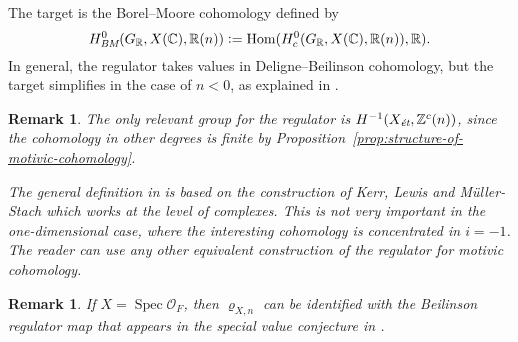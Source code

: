 \documentclass[draft]{article}
\DeclareMathOperator{\Hom}{Hom}
\DeclareMathOperator{\Spec}{Spec}
\newcommand{\CC}{\mathbb{C}}
\newcommand{\RR}{\mathbb{R}}
\newcommand{\ZZ}{\mathbb{Z}}
\newcommand{\BM}{\text{\it BM}}
\newcommand{\et}{\text{\it \'{e}t}}
\newcommand{\dfn}{\mathrel{\mathop:}=}
\theoremstyle{myplain}
\theoremstyle{mydefinition}
\newtheorem{remark}[theorem]{Remark}
\begin{document}
The target is the Borel--Moore cohomology defined by
\[ H^0_\BM (G_\RR, X(\CC), \RR(n)) \dfn
  \Hom (H^0_c (G_\RR, X(\CC), \RR(n)), \RR). \]
In general, the regulator takes values in Deligne--Beilinson cohomology, but the
target simplifies in the case of $n < 0$, as explained in
\cite[\S 2]{Beshenov-Weil-etale-2}.

\begin{remark}
  The only relevant group for the regulator is $H^{-1} (X_\et, \ZZ^c (n))$,
  since the cohomology in other degrees is finite by
  Proposition~\ref{prop:structure-of-motivic-cohomology}.

  The general definition in \cite[\S 2]{Beshenov-Weil-etale-2} is based on the
  construction of Kerr, Lewis and M\"{u}ller-Stach
  \cite{Kerr-Lewis-Muller-Stach-2006} which works at the level of
  complexes. This is not very important in the one-dimensional case, where the
  interesting cohomology is concentrated in $i = -1$. The reader can use any
  other equivalent construction of the regulator for motivic cohomology.
\end{remark}

\begin{remark}
  If $X = \Spec \mathcal{O}_F$, then $\varrho_{X,n}$ can be identified with the
  Beilinson regulator map that appears in the special value conjecture in
  \cite[\S 5.8.3]{Flach-Morin-2018}.
\end{remark}
\end{document}
